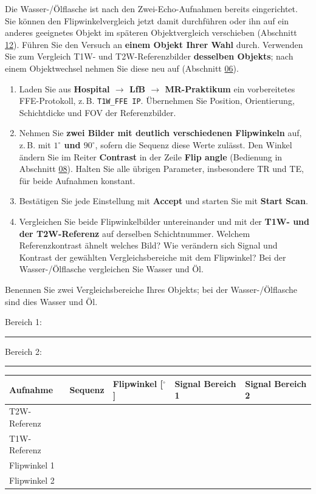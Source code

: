 \documentclass[a4paper,11pt]{article}
\newcommand{\subhead}[1]{\par\vspace{2mm}{\sffamily\bfseries\color{ink}\large #1\par}\nopagebreak}
\newcommand{\ui}[1]{\textsf{\textbf{#1}}}
\newcommand{\seq}[1]{\texttt{#1}}
\newcommand{\blank}{\rule{20mm}{0.35pt}}
\begin{document}
Die Wasser-/Ölflasche ist nach den Zwei-Echo-Aufnahmen bereits eingerichtet. Sie können den Flipwinkelvergleich jetzt damit durchführen oder ihn auf ein anderes geeignetes Objekt im späteren Objektvergleich verschieben (Abschnitt \hyperref[varianten]{12}). Führen Sie den Versuch an \textbf{einem Objekt Ihrer Wahl} durch. Verwenden Sie zum Vergleich T1W- und T2W-Referenzbilder \textbf{desselben Objekts}; nach einem Objektwechsel nehmen Sie diese neu auf (Abschnitt \hyperref[referenz]{06}).
\begin{enumerate}
\item Laden Sie aus \ui{Hospital $\rightarrow$ LfB $\rightarrow$ MR-Praktikum} ein vorbereitetes FFE-Protokoll, z.\,B. \seq{T1W\_FFE IP}. Übernehmen Sie Position, Orientierung, Schichtdicke und FOV der Referenzbilder.
\item Nehmen Sie \textbf{zwei Bilder mit deutlich verschiedenen Flipwinkeln} auf, z.\,B. mit \textbf{$1^\circ$ und $90^\circ$}, sofern die Sequenz diese Werte zulässt. Den Winkel ändern Sie im Reiter \ui{Contrast} in der Zeile \ui{Flip angle} (Bedienung in Abschnitt \hyperref[parameter]{08}). Halten Sie alle übrigen Parameter, insbesondere TR und TE, für beide Aufnahmen konstant.
\item Bestätigen Sie jede Einstellung mit \ui{Accept} und starten Sie mit \ui{Start Scan}.
\item Vergleichen Sie beide Flipwinkelbilder untereinander und mit der \textbf{T1W- und der T2W-Referenz} auf derselben Schichtnummer. Welchem Referenzkontrast ähnelt welches Bild? Wie verändern sich Signal und Kontrast der gewählten Vergleichsbereiche mit dem Flipwinkel? Bei der Wasser-/Ölflasche vergleichen Sie Wasser und Öl.
\end{enumerate}

\subhead{Kontraste vergleichen}
Benennen Sie zwei Vergleichsbereiche Ihres Objekts; bei der Wasser-/Ölflasche sind dies Wasser und Öl.
\par Bereich 1: \blank\qquad Bereich 2: \blank\par\vspace{1mm}
\begin{tabularx}{\linewidth}{@{}P{34mm}P{30mm}P{24mm}Y Y@{}}
\toprule
\textbf{Aufnahme} & \textbf{Sequenz} & \textbf{Flipwinkel [$^\circ$]} & \textbf{Signal Bereich 1} & \textbf{Signal Bereich 2} \\
\midrule
T2W-Referenz & \hrulefill & \hrulefill & \hrulefill & \hrulefill \\
T1W-Referenz & \hrulefill & \hrulefill & \hrulefill & \hrulefill \\
Flipwinkel 1 & \hrulefill & \hrulefill & \hrulefill & \hrulefill \\
Flipwinkel 2 & \hrulefill & \hrulefill & \hrulefill & \hrulefill \\
\bottomrule
\end{tabularx}
\end{document}
